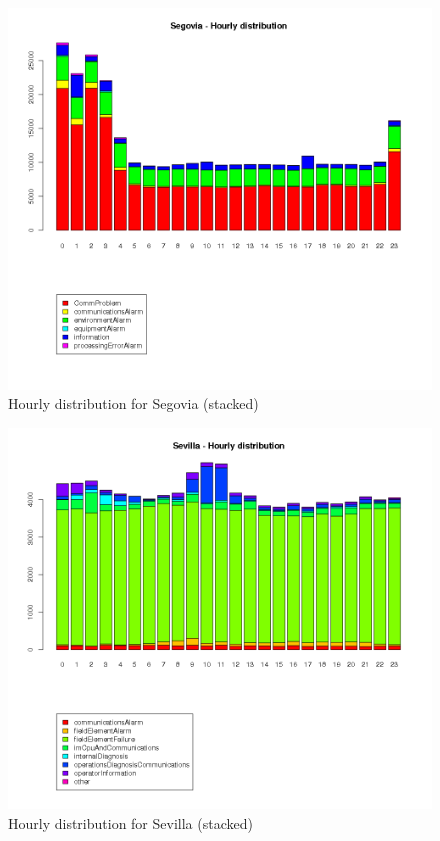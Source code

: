\documentclass[a4paper,12pt]{article}
\begin{document}
\begin{figure}[h!]
 \centering
 \includegraphics[height=0.4\textheight]{./img/segovia_timeline.png}
 \caption{Hourly distribution for Segovia (stacked)}
\end{figure}
\begin{figure}[h!]
 \centering
 \includegraphics[height=0.4\textheight]{./img/sevilla_timeline.png}
 \caption{Hourly distribution for Sevilla (stacked)}
\end{figure}
\end{document}
